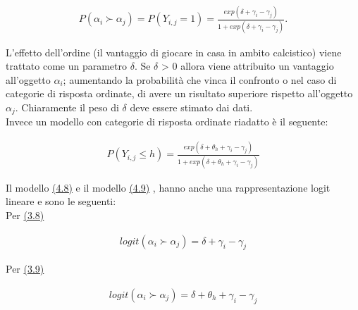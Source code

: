 \begin{align} 
	P(\alpha_{i}\succ \alpha_{j}) = P(Y_{i,j} = 1) = \frac{exp(\delta + \gamma_{i} - \gamma_{j})}{1 + exp(\delta + \gamma_{i} - \gamma_{j})} \label{for:3.8}. 
\end{align}

L'effetto dell'ordine (il vantaggio di giocare in casa in ambito calcistico) viene trattato come un parametro $\delta$. Se $\delta$ > 0 allora viene attribuito un vantaggio all'oggetto $\alpha_{i}$; aumentando la probabilità che vinca il confronto o nel caso di categorie di risposta ordinate, di avere un risultato superiore rispetto all'oggetto $\alpha_{j}$. Chiaramente il peso di $\delta$ deve essere stimato dai dati.\\

Invece un modello con categorie di risposta ordinate riadatto è il seguente:

\begin{align}
	P(Y_{i,j}\leq h) =  \frac{exp(\delta + \theta_{h} + \gamma_{i} - \gamma_{j})}{1 + exp(\delta + \theta_{h} + \gamma_{i} - \gamma_{j})} \label{for:3.9}
\end{align}

Il modello \hyperref[for:3.8]{(4.8)} e il modello \hyperref[for:3.9]{(4.9)} , hanno anche una rappresentazione logit lineare e sono le seguenti:\\

Per \hyperref[for:3.8]{(3.8)}

\begin{align}
	logit(\alpha_{i} \succ \alpha_{j}) =  \delta + \gamma_i - \gamma_j 
\end{align}

Per \hyperref[for:3.9]{(3.9)}

\begin{align}
	logit(\alpha_{i} \succ \alpha_{j}) =  \delta + \theta_{h} + \gamma_i - \gamma_j 
\end{align}
	
